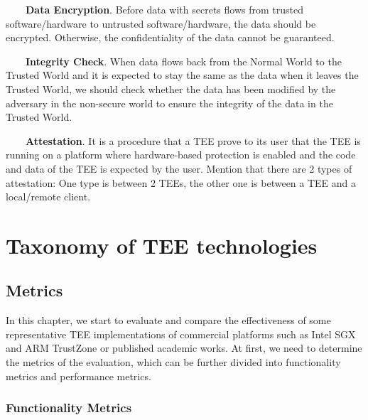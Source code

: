 \documentclass[12pt,twoside]{report}
\begin{document}
\ \ \ \ \textbf{Data Encryption}. Before data with secrets flows from trusted software/hardware to untrusted software/hardware, the data should be encrypted. Otherwise, the confidentiality of the data cannot be guaranteed.

\ \ \ \ \textbf{Integrity Check}. When data flows back from the Normal World to the Trusted World and it is expected to stay the same as the data when it leaves the Trusted World, we should check whether the data has been modified by the adversary in the non-secure world to ensure the integrity of the data in the Trusted World. 

\ \ \ \ \textbf{Attestation}. It is a procedure that a TEE prove to its user that the TEE is running on a platform where hardware-based protection is enabled and the code and data of the TEE is expected by the user. Mention that there are 2 types of attestation: One type is between 2 TEEs, the other one is between a TEE and a local/remote client.





\chapter{Taxonomy of TEE technologies}

\section{Metrics}

In this chapter, we start to evaluate and compare the effectiveness of some representative TEE implementations of commercial platforms such as Intel SGX and ARM TrustZone or published academic works. At first, we need to determine the metrics of the evaluation, which can be further divided into functionality metrics and performance metrics.

\subsection{Functionality Metrics}
\end{document}
